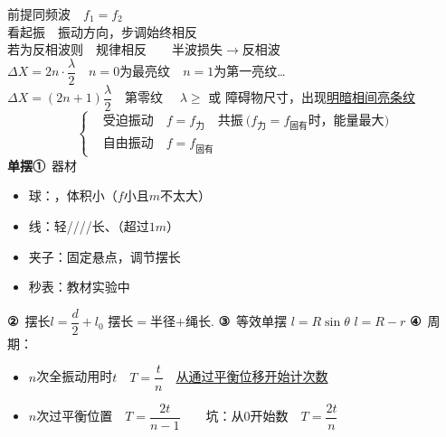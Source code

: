 前提同频波　$f_1=f_2$\\
看起振　振动方向，步调始终相反\\
若为反相波则　规律相反　　半波损失$\to$反相波\\[1ex]
$\Delta X=2n\cdot\dfrac{\lambda}{2}$　$n=0$为最亮纹　$n=1$为第一亮纹…\\[1ex]
$\Delta X=(2n+1)\dfrac{\lambda}{2}$　第零纹 %
　$\lambda\ge$ 或 \unclear{$\approx$} 障碍物尺寸，出现\underline{明暗相间亮条纹}
\[
\left\{\begin{aligned}
&\text{受迫振动}\quad f=f_{\text{力}}\quad\text{共振}\ \bigl(f_{\text{力}}=f_{\text{固有}}\text{时，能量最大}\bigr)\\
&\text{自由振动}\quad f=f_{\text{固有}}
\end{aligned}\right.
\]
\textbf{单摆}\quad\textbf{①}\ 器材
\begin{itemize}
\item 球：，体积小\quad（$f$小且$m$不太大）
\item 线：轻////长、（超过$1\unit{m}$）
\item 夹子：固定悬点，调节摆长
\item 秒表：教材实验中\ 
\end{itemize}
\textbf{②}\ 摆长\quad $l=\dfrac{d}{2}+l_0$
摆长$=$半径$+$绳长.
\textbf{③}\ 等效单摆
$l=R\sin\theta$
$l=R-r$
\textbf{④}\ 周期：
\begin{itemize}
\item $n$次全振动用时$t$　$T=\dfrac{t}{n}$　\underline{从通过平衡位移开始计次数} %
\item $n$次过平衡位置　$T=\dfrac{2t}{n-1}$　　坑：从$0$开始数　$T=\dfrac{2t}{n}$
\end{itemize}
